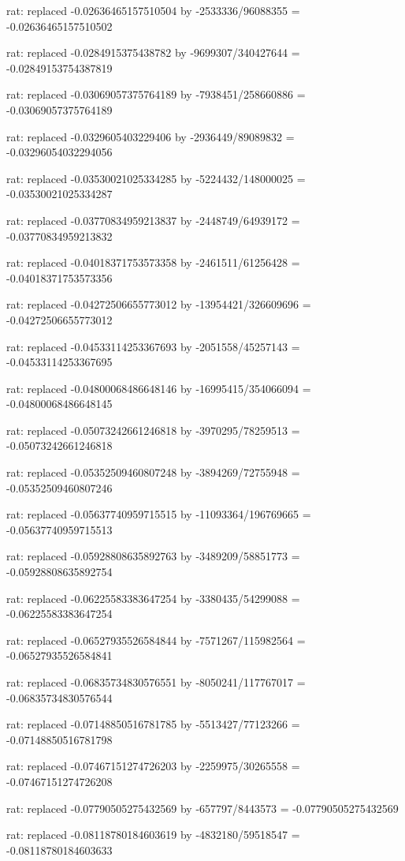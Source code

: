 \documentclass[a4paper,10pt]{article}
\begin{document}
\begin{eulernotebook}
\begin{eulercomment}
\begin{eulercomment}
\begin{eulercomment}
\begin{eulercomment}
\begin{eulercomment}
\begin{eulercomment}
\begin{eulercomment}
\begin{eulercomment}
\begin{eulercomment}
\begin{eulercomment}
\begin{eulercomment}
\begin{eulercomment}
\begin{eulercomment}
\begin{eulercomment}
\begin{eulercomment}
\begin{eulercomment}
\begin{euleroutput}
  rat: replaced -0.02636465157510504 by -2533336/96088355 = -0.02636465157510502
  
  rat: replaced -0.0284915375438782 by -9699307/340427644 = -0.02849153754387819
  
  rat: replaced -0.03069057375764189 by -7938451/258660886 = -0.03069057375764189
  
  rat: replaced -0.0329605403229406 by -2936449/89089832 = -0.03296054032294056
  
  rat: replaced -0.03530021025334285 by -5224432/148000025 = -0.03530021025334287
  
  rat: replaced -0.03770834959213837 by -2448749/64939172 = -0.03770834959213832
  
  rat: replaced -0.04018371753573358 by -2461511/61256428 = -0.04018371753573356
  
  rat: replaced -0.04272506655773012 by -13954421/326609696 = -0.04272506655773012
  
  rat: replaced -0.04533114253367693 by -2051558/45257143 = -0.04533114253367695
  
  rat: replaced -0.04800068486648146 by -16995415/354066094 = -0.04800068486648145
  
  rat: replaced -0.05073242661246818 by -3970295/78259513 = -0.05073242661246818
  
  rat: replaced -0.05352509460807248 by -3894269/72755948 = -0.05352509460807246
  
  rat: replaced -0.05637740959715515 by -11093364/196769665 = -0.05637740959715513
  
  rat: replaced -0.05928808635892763 by -3489209/58851773 = -0.05928808635892754
  
  rat: replaced -0.06225583383647254 by -3380435/54299088 = -0.06225583383647254
  
  rat: replaced -0.06527935526584844 by -7571267/115982564 = -0.06527935526584841
  
  rat: replaced -0.06835734830576551 by -8050241/117767017 = -0.06835734830576544
  
  rat: replaced -0.07148850516781785 by -5513427/77123266 = -0.07148850516781798
  
  rat: replaced -0.07467151274726203 by -2259975/30265558 = -0.07467151274726208
  
  rat: replaced -0.07790505275432569 by -657797/8443573 = -0.07790505275432569
  
  rat: replaced -0.08118780184603619 by -4832180/59518547 = -0.08118780184603633
  

\end{euleroutput}
\end{eulercomment}
\end{eulercomment}
\end{eulercomment}
\end{eulercomment}
\end{eulercomment}
\end{eulercomment}
\end{eulercomment}
\end{eulercomment}
\end{eulercomment}
\end{eulercomment}
\end{eulercomment}
\end{eulercomment}
\end{eulercomment}
\end{eulercomment}
\end{eulercomment}
\end{eulercomment}
\end{eulernotebook}
\end{document}
